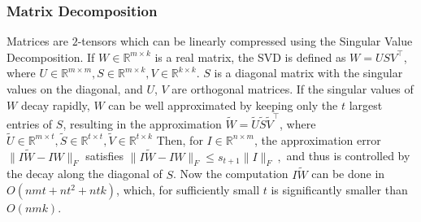 \subsubsection{Matrix Decomposition}\label{subsubsec:svd}
Matrices are $2$-tensors which can be linearly compressed using the Singular Value Decomposition. 
If $W \in \mathbb{R}^{m \times k}$ is a real matrix, the SVD is defined as
	$W = USV^{\top}$, where $U \in \mathbb{R}^{m \times m}, S \in \mathbb{R}^{m \times k}, V \in \mathbb{R}^{k \times k}$.
$S$ is a diagonal matrix with the singular values on the diagonal, and $U$, $V$ are orthogonal matrices. 
If the singular values of $W$ decay rapidly, $W$ can be well approximated by keeping only the $t$ largest entries of $S$, 
resulting in the approximation 
	$\tilde{W} = \tilde{U}\tilde{S}\tilde{V}^{\top}$, where $\tilde{U} \in \mathbb{R}^{m \times t}, \tilde{S} \in \mathbb{R}^{t \times t}, \tilde{V} \in \mathbb{R}^{t \times k}$
Then, for $I \in \mathbb{R}^{n \times m}$, the approximation error $\| I \tilde{W} - I W \|_F$ satisfies 
  $\| I \tilde{W} - I W \|_F \leq s_{t+1} \| I \|_F~,$
and thus is controlled by the decay along the diagonal of $S$.
Now the computation $I\tilde{W}$ can be done in $O(nmt + nt^2 + ntk)$, which, for sufficiently small $t$ is significantly smaller than $O(nmk)$. 

